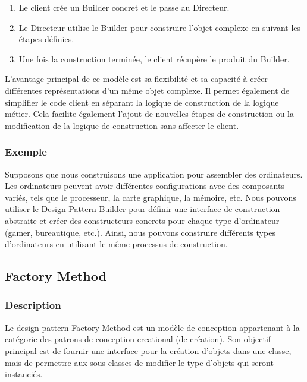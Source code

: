 \documentclass[french]{article}
\begin{document}
\begin{enumerate}
    \item Le client crée un Builder concret et le passe au Directeur.
    \item Le Directeur utilise le Builder pour construire l'objet complexe en suivant les étapes définies.
    \item Une fois la construction terminée, le client récupère le produit du Builder.
\end{enumerate}

L'avantage principal de ce modèle est sa flexibilité et sa capacité à créer différentes représentations d'un même objet complexe. Il permet également de simplifier le code client en séparant la logique de construction de la logique métier. Cela facilite également l'ajout de nouvelles étapes de construction ou la modification de la logique de construction sans affecter le client.


\subsubsection{Exemple}

Supposons que nous construisons une application pour assembler des ordinateurs. Les ordinateurs peuvent avoir différentes configurations avec des composants variés, tels que le processeur, la carte graphique, la mémoire, etc. Nous pouvons utiliser le Design Pattern Builder pour définir une interface de construction abstraite et créer des constructeurs concrets pour chaque type d'ordinateur (gamer, bureautique, etc.). Ainsi, nous pouvons construire différents types d'ordinateurs en utilisant le même processus de construction.





\subsection{Factory Method}

\subsubsection{Description}

Le design pattern Factory Method est un modèle de conception appartenant à la catégorie des patrons de conception creational (de création). Son objectif principal est de fournir une interface pour la création d'objets dans une classe, mais de permettre aux sous-classes de modifier le type d'objets qui seront instanciés.
\end{document}
